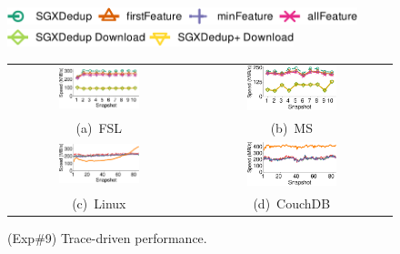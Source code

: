 \begin{figure}[t]
    \centering
    \includegraphics[height=0.2in]{pic/featurespy/plot/performance/LANTrace/trace_legend_upload.pdf}\\
    \includegraphics[height=0.2in]{pic/featurespy/plot/performance/LANTrace/trace_legend_download.pdf}\\
    \vspace{3pt}
    \begin{tabular}{@{\ }c@{\ }c}
        \includegraphics[width=0.47\textwidth]{pic/featurespy/plot/performance/LANTrace/trace_fsl.pdf}&
        \includegraphics[width=0.47\textwidth]{pic/featurespy/plot/performance/LANTrace/trace_ms.pdf}\\
        \mbox{\small (a) FSL} &
        \mbox{\small (b) MS}\\
        \includegraphics[width=0.47\textwidth]{pic/featurespy/plot/performance/LANTrace/trace_linux.pdf}&
        \includegraphics[width=0.47\textwidth]{pic/featurespy/plot/performance/LANTrace/trace_couch.pdf}\\
        \mbox{\small (c) Linux} &
        \mbox{\small (d) CouchDB}\\
    \end{tabular}
    \vspace{-6pt}
    \caption{(Exp\#9) Trace-driven performance.}
    \vspace{-6pt}
    \label{fig:featurespy-traceDrivenThroughput}
\end{figure}
